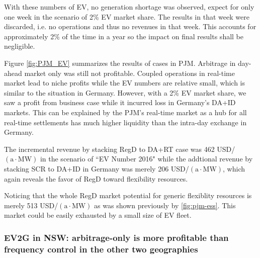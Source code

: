 
With these numbers of EV, no generation shortage was observed, expect for only one week in the scenario of 2\% EV market share. The results in that week were discarded, i.e. no operations and thus no revenues in that week. This accounts for approximately 2\% of the time in a year so the impact on final results shall be negligible.

Figure \ref{fig:PJM_EV} summarizes the results of cases in PJM. Arbitrage in day-ahead market only was still not profitable. Coupled operations in real-time market lead to niche profits while the EV numbers are relative small, which is similar to the situation in Germany. However, with a 2\% EV market share, we saw a profit from business case while it incurred loss in Germany's DA+ID markets. This can be explained by the PJM's real-time market as a hub for all real-time settlements has much higher liquidity than the intra-day exchange in Germany.

The incremental revenue by stacking RegD to DA+RT case was 462 USD/$(\text{a} \cdot \text{MW})$ in the scenario of ``EV Number 2016" while the addtional revenue by stacking SCR to DA+ID in Germany was merely 206 USD/$(\text{a} \cdot \text{MW})$, which again reveals the favor of RegD toward flexibility resources. 

Noticing that the whole RegD market potential for generic flexiblity resources is merely 513 USD/$(\text{a} \cdot \text{MW})$ as was shown previously by \ref{fig:pjm-ess}. This market could be easily exhausted by a small size of EV fleet. 

\subsubsection{EV2G in NSW: arbitrage-only is more profitable than frequency control in the other two geographies}

